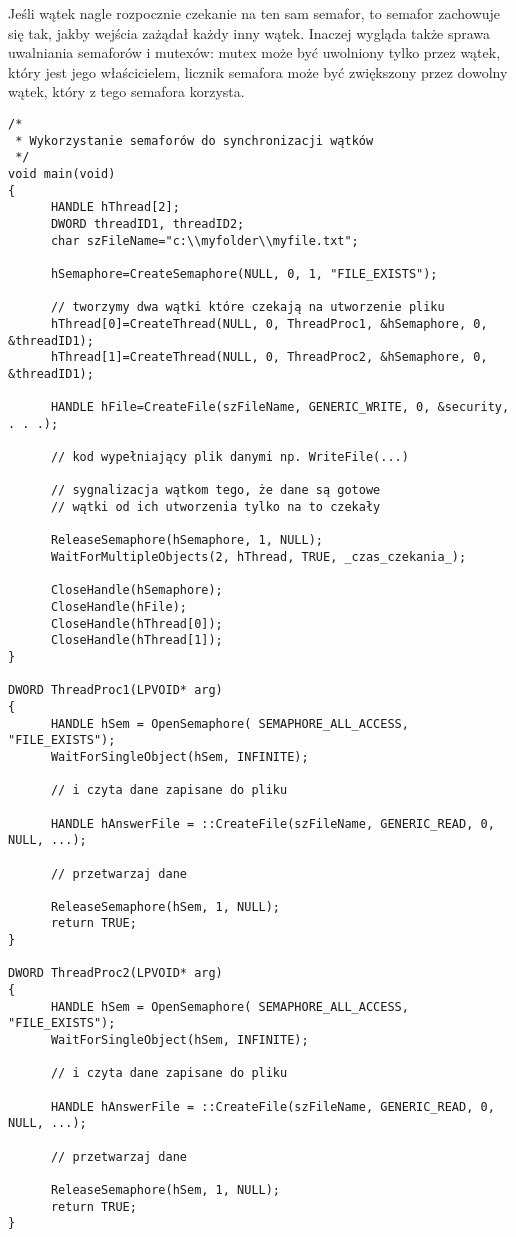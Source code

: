 Jeśli wątek nagle rozpocznie czekanie na ten sam semafor, to semafor zachowuje się tak, 
jakby wejścia zażądał każdy inny wątek. Inaczej wygląda także sprawa uwalniania semaforów i mutexów: 
mutex może być uwolniony tylko przez wątek, który jest jego właścicielem, 
licznik semafora może być zwiększony przez dowolny wątek, który z tego semafora korzysta. 

\begin{scriptsize}
\begin{verbatim}
/*
 * Wykorzystanie semaforów do synchronizacji wątków
 */
void main(void)  
{  
      HANDLE hThread[2];  
      DWORD threadID1, threadID2;  
      char szFileName="c:\\myfolder\\myfile.txt";  

      hSemaphore=CreateSemaphore(NULL, 0, 1, "FILE_EXISTS");  

      // tworzymy dwa wątki które czekają na utworzenie pliku  
      hThread[0]=CreateThread(NULL, 0, ThreadProc1, &hSemaphore, 0, &threadID1);  
      hThread[1]=CreateThread(NULL, 0, ThreadProc2, &hSemaphore, 0, &threadID1);  

      HANDLE hFile=CreateFile(szFileName, GENERIC_WRITE, 0, &security, . . .);  

      // kod wypełniający plik danymi np. WriteFile(...)  

      // sygnalizacja wątkom tego, że dane są gotowe  
      // wątki od ich utworzenia tylko na to czekały   

      ReleaseSemaphore(hSemaphore, 1, NULL);  
      WaitForMultipleObjects(2, hThread, TRUE, _czas_czekania_);  

      CloseHandle(hSemaphore);  
      CloseHandle(hFile);  
      CloseHandle(hThread[0]);  
      CloseHandle(hThread[1]);  
}  
 
DWORD ThreadProc1(LPVOID* arg)  
{  
      HANDLE hSem = OpenSemaphore( SEMAPHORE_ALL_ACCESS, "FILE_EXISTS");  
      WaitForSingleObject(hSem, INFINITE);  

      // i czyta dane zapisane do pliku  

      HANDLE hAnswerFile = ::CreateFile(szFileName, GENERIC_READ, 0, NULL, ...);

      // przetwarzaj dane  

      ReleaseSemaphore(hSem, 1, NULL);  
      return TRUE;  
}  

DWORD ThreadProc2(LPVOID* arg)  
{  
      HANDLE hSem = OpenSemaphore( SEMAPHORE_ALL_ACCESS, "FILE_EXISTS");  
      WaitForSingleObject(hSem, INFINITE);  

      // i czyta dane zapisane do pliku  

      HANDLE hAnswerFile = ::CreateFile(szFileName, GENERIC_READ, 0, NULL, ...);

      // przetwarzaj dane  

      ReleaseSemaphore(hSem, 1, NULL);  
      return TRUE;  
}  
\end{verbatim}
\end{scriptsize}

